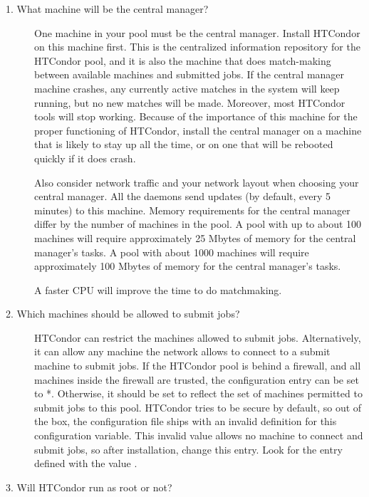 \begin{description}

\item[1. What machine will be the central manager?]

One machine in your pool must be the central manager.
Install HTCondor on this machine first.
This is the centralized information repository for the HTCondor pool,
and it is also the
machine that does match-making between available machines and
submitted jobs.
If the central manager machine crashes, any currently active
matches in the system will keep running, but no new matches will be
made.  Moreover, most HTCondor tools will stop working.  Because of the
importance of this machine for the proper functioning of HTCondor,
install the central manager on a machine that is likely to stay up all the
time, or on one that will be rebooted quickly if it does crash.

Also consider
network traffic and your network layout when choosing your central
manager.
All the daemons send updates (by default, every 5 minutes) to this machine.
Memory requirements for the central manager differ by the number of machines
in the pool.
A pool with up to about 100 machines will require approximately
25 Mbytes of memory for the central manager's tasks.
A pool with about 1000 machines will require approximately
100 Mbytes of memory for the central manager's tasks.

A faster CPU will improve the time to do matchmaking. 

\item[2. Which machines should be allowed to submit jobs?]

HTCondor can restrict the machines allowed to submit jobs.  Alternatively, 
it can allow any machine the network allows to connect to a submit machine
to submit jobs.  If the HTCondor pool is behind a firewall, and all machines
inside the firewall are trusted, the  configuration
entry can be set to *.  Otherwise, it should be set to reflect
the set of machines permitted to submit jobs to this pool.
HTCondor tries to be secure by default,
so out of the box, the configuration file ships with an invalid definition
for this configuration variable.
This invalid value allows no machine to connect and submit
jobs, so after installation, change this entry.
Look for the
entry defined with the value
.

\item[3. Will HTCondor run as root or not?]


\end{description}
